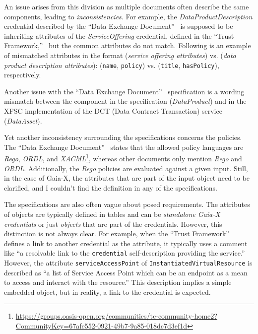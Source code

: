 An issue arises from this division as multiple documents often describe the same components, leading to \textit{inconsistencies}.
For example, the \textit{DataProductDescription} credential described by the ``Data Exchange Document''~\cite{gaiax_data_exchange_document} is supposed to be inheriting attributes of the \textit{ServiceOffering} credential, defined in the ``Trust Framework,''~\cite{gaiax_trust_framework} but the common attributes do not match.
Following is an example of mismatched attributes in the format (\textit{service offering attributes}) vs. (\textit{data product description attributes}): (\texttt{name}, \texttt{policy}) vs. (\texttt{title}, \texttt{hasPolicy}), respectively.

Another issue with the ``Data Exchange Document''~\cite{gaiax_data_exchange_document} specification is a wording mismatch between the component in the specification (\textit{DataProduct}) and in the XFSC implementation of the DCT (Data Contract Transaction) service (\textit{DataAsset}).

Yet another inconsistency surrounding the specifications concerns the policies.
The ``Data Exchange Document''~\cite{gaiax_data_exchange_document} states that the allowed policy languages are \textit{Rego}, \textit{ORDL}, and \textit{XACML}\footnote{\url{https://groups.oasis-open.org/communities/tc-community-home2?CommunityKey=67afe552-0921-49b7-9a85-018dc7d3ef1d}}, whereas other documents only mention \textit{Rego} and \textit{ORDL}.
Additionally, the \textit{Rego} policies are evaluated against a given input.
Still, in the case of Gaia-X, the attributes that are part of the input object need to be clarified, and I couldn't find the definition in any of the specifications.

The specifications are also often vague about posed requirements.
The attributes of objects are typically defined in tables and can be \textit{standalone Gaia-X credentials} or just \textit{objects} that are part of the credentials.
However, this distinction is not always clear.
For example, when the ``Trust Framework''~\cite{gaiax_trust_framework} defines a link to another credential as the attribute, it typically uses a comment like ``a resolvable link to the \texttt{credential} self-description providing the service.''
However, the attribute \texttt{serviceAccessPoint} of \texttt{InstantiatedVirtualResource} is described as ``a list of Service Access Point which can be an endpoint as a mean to access and interact with the resource.''
This description implies a simple embedded object, but in reality, a link to the credential is expected.

